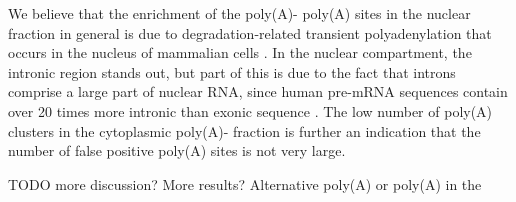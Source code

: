 We believe that the enrichment of the poly(A)- poly(A) sites in the nuclear
fraction in general is due to degradation-related transient polyadenylation
that occurs in the nucleus of mammalian cells \cite{lemay_nuclear_2010,
lacava_rna_2005, wyers_cryptic_2005}. In the nuclear compartment, the intronic
region stands out, but part of this is due to the fact that introns comprise a
large part of nuclear RNA, since human pre-mRNA sequences contain over 20 times
more intronic than exonic sequence \cite{venter_sequence_2001}. The low number
of poly(A) clusters in the cytoplasmic poly(A)- fraction is further an
indication that the number of false positive poly(A) sites is not very large.

TODO more discussion? More results? Alternative poly(A) or poly(A) in the
